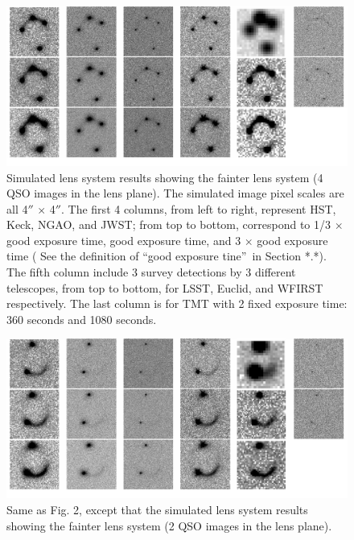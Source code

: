\documentclass[a4paper,11pt]{article}
\begin{document}
\begin{figure}
\begin{center}
\includegraphics[width=1.0\textwidth]{fainter_system_4QSOimages_all.png}
\end{center}
\caption{Simulated lens system results showing the fainter lens system (4 QSO images in the lens plane). The simulated image pixel scales are all 4$''$ $\times$ 4$''$. The first 4 columns, from left to right, represent HST, Keck, NGAO, and JWST; from top to bottom, correspond to 1/3 $\times$ good exposure time, good exposure time, and 3 $\times$ good exposure time ( See the definition of \textquotedblleft good exposure tine\textquotedblright\ in Section *.*). The fifth column include 3 survey detections by 3 different telescopes, from top to bottom, for LSST, Euclid, and WFIRST respectively. The last column is for TMT with 2 fixed exposure time: 360 seconds and 1080 seconds.}
\label{fig:fainter_4QSOimages_montage}
\end{figure}


\begin{figure}
\begin{center}
\includegraphics[width=1.0\textwidth]{fainter_system_2QSOimages_all.png}
\end{center}
\caption{Same as Fig. 2, except that the simulated lens system results showing the fainter lens system (2 QSO images in the lens plane).}
\label{fig:fainter_2QSOimages_montage}
\end{figure}
\end{document}
